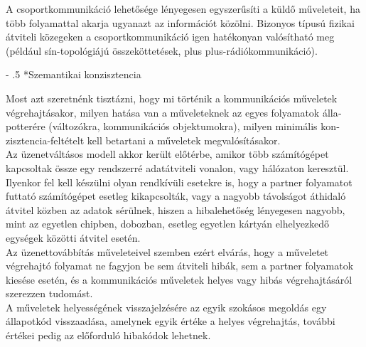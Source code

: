 \documentclass[tikz,12pt,margin=0px]{article}
\makeatletter
\renewcommand\paragraph{%
	\@startsection{paragraph}{4}{0mm}%
	{-\baselineskip}%
	{.5\baselineskip}%
	{\normalfont\normalsize\bfseries}}
\newcommand\lword[1]{\leavevmode\nobreak\hskip0pt plus\linewidth\penalty50\hskip0pt plus-\linewidth\nobreak #1}
\makeatother
\begin{document}
    \noindent A csoportkommunikáció lehetősége lényegesen egyszerűsíti a küldő műveleteit, ha több folyamattal akarja ugyanazt az információt közölni. Bizonyos típusú fizikai átviteli közegeken a csoportkommunikáció igen hatékonyan valósítható meg (például sín-topológiájú összeköttetések, \lword{rádiókommunikáció}).

    \paragraph*{Szemantikai konzisztencia}

    Most azt szeretnénk tisztázni, hogy mi történik a kommunikációs műveletek végrehajtásakor, milyen hatása van a műveleteknek az egyes folyamatok ál­la­­potterére (változókra, kommunikációs objektumokra), milyen minimális kon­zisztencia-feltételt kell betartani a műveletek megvalósításakor.\\

    \noindent Az üzenetváltásos modell akkor került előtérbe, amikor több számítógépet kapcsoltak össze egy rendszerré adatátviteli vonalon, vagy hálózaton keresztül. Ilyenkor fel kell készülni olyan rendkívüli esetekre is, hogy a partner folyamatot futtató számítógépet esetleg kikapcsolták, vagy a nagyobb távolságot áthidaló átvitel közben az adatok sérülnek, hiszen a hibalehetőség lényegesen nagyobb, mint az egyetlen chipben, dobozban, esetleg egyetlen kártyán elhelyezkedő egységek közötti átvitel esetén.\\

    \noindent Az üzenettovábbítás műveleteivel szemben ezért elvárás, hogy a műveletet végrehajtó folyamat ne fagyjon be sem átviteli hibák, sem a partner folyamatok kiesése esetén, és a kommunikációs műveletek helyes vagy hibás végrehajtásáról szerezzen tudomást.\\

    \noindent A műveletek helyességének visszajelzésére az egyik szokásos megoldás egy állapotkód visszaadása, amelynek egyik értéke a helyes végrehajtás, további értékei pedig az előforduló hibakódok lehetnek.\\
\end{document}
